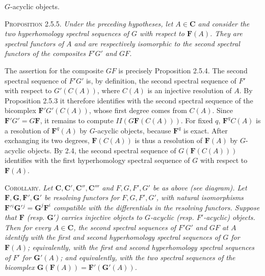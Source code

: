 
\noindent $G$-acyclic objects.

\textsc{Proposition 2.5.5.} \textit{Under the preceding
hypotheses, let $A\in \mathbf C$ and consider the two hyperhomology spectral sequences
of $G$ with respect to $\mathbf F(A)$. They are spectral functors of $A$ and
are respectively isomorphic to the second spectral functors of the composites
$F'G'$ and $GF$.}

The assertion for the composite $GF$ is precisely Proposition 2.5.4. The
second spectral sequence of $F'G'$ is, by definition, the second spectral
sequence of $F'$ with respect to $G'(C(A))$, where $C(A)$ is an injective
resolution of $A$. By Proposition 2.5.3 it therefore identifies with the
second spectral sequence of the bicomplex $\mathbf F'G'(C(A))$, whose first
degree comes from $C(A)$. Since $\mathbf F'G'=G\mathbf F$, it remains to
compute $II(G\mathbf F(C(A)))$. For fixed $q$,
$\mathbf F^qC(A)$ is a resolution of $\mathbf F^q(A)$ by $G$-acyclic
objects, because $\mathbf F^q$ is exact. After exchanging its two degrees,
$\mathbf F(C(A))$ is thus a resolution of $\mathbf F(A)$ by $G$-acyclic
objects. By 2.4, the second spectral sequence of
$G(\mathbf F(C(A)))$ identifies with the first hyperhomology spectral
sequence of $G$ with respect to $\mathbf F(A)$.

\textsc{Corollary.} \textit{Let $\mathbf C,\mathbf C',\mathbf C'',\mathbf C'''$ and
$F,G,F',G'$ be as above \textup{(}see diagram\textup{)}. Let $\mathbf F,\mathbf G,\mathbf F',\mathbf G'$ be
resolving functors for $F,G,F',G'$, with natural isomorphisms
$\mathbf F'{}^i\mathbf G'{}^j=\mathbf G^j\mathbf F^i$ compatible with the differentials
in the resolving functors. Suppose that $\mathbf F$ \textup{(}resp. $\mathbf G'$\textup{)} carries injective objects to
$G$-acyclic \textup{(}resp. $F'$-acyclic\textup{)} objects. Then for every
$A\in \mathbf C$, the second spectral sequences of $F'G'$ and $GF$ at $A$ identify
with the first and second hyperhomology spectral sequences of $G$ for
$\mathbf F(A)$; equivalently, with the first and second hyperhomology spectral
sequences of $F'$ for $\mathbf G'(A)$; and equivalently, with the two spectral
sequences of the bicomplex
$\mathbf G(\mathbf F(A))=\mathbf F'(\mathbf G'(A))$.}

